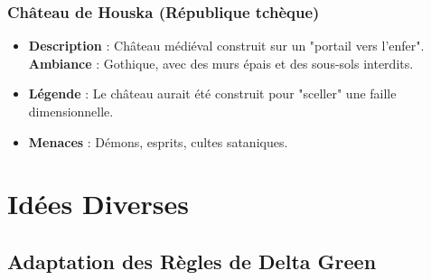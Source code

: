 \documentclass[10pt,a5paper,twoside]{book}
\begin{document}
\newpage

\subsection{Château de Houska (République tchèque)}
\begin{itemize}
	\item \textbf{Description} : Château médiéval construit sur un "portail vers l'enfer". \textbf{Ambiance} : Gothique, avec des murs épais et des sous-sols interdits.
	\item \textbf{Légende} : Le château aurait été construit pour "sceller" une faille dimensionnelle.
	\item \textbf{Menaces} : Démons, esprits, cultes sataniques.
\end{itemize}

\newpage

\chapter{Idées Diverses}

\section{Adaptation des Règles de Delta Green}
\end{document}
